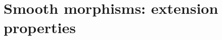 \documentclass[../main.tex]{subfiles}
\begin{document}
\setcounter{chapter}{2}
\chapter{Smooth morphisms: extension properties}
\end{document}

